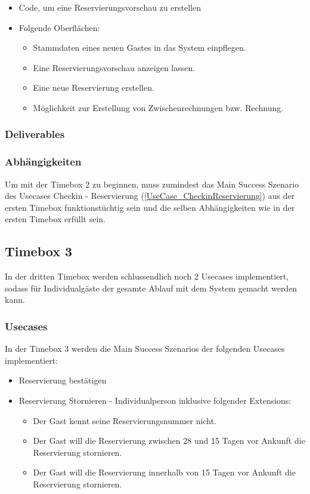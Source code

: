 \begin{itemize}
	\item Code, um eine \Gls{Reservierung}svorschau zu erstellen
	\item Folgende Oberflächen:
	\begin{itemize}
		\item Stammdaten eines neuen \Gls{Gast}es in das System einpflegen.
		\item Eine \Gls{Reservierung}svorschau anzeigen lassen.
		\item Eine neue \Gls{Reservierung} erstellen.
		\item Möglichkeit zur Erstellung von Zwischenrechnungen bzw. \Gls{Rechnung}.
	\end{itemize}
\end{itemize}

\subsubsection{Deliverables}
\subsubsection{Abhängigkeiten}
Um mit der Timebox 2 zu beginnen, muss zumindest das Main Success Szenario des Usecases Checkin - Reservierung (\ref{UseCase_CheckinReservierung}) aus der ersten Timebox funktionstüchtig sein
und die selben Abhängigkeiten wie in der ersten Timebox erfüllt sein.


\subsection{Timebox 3}
In der dritten Timebox werden schlussendlich noch 2 Usecases implementiert, sodass für Individualgäste der gesamte Ablauf mit dem System gemacht werden kann.

\subsubsection{Usecases}
In der Timebox 3 werden die Main Success Szenarios der folgenden Usecases implementiert:

\begin{itemize}
	\item \Gls{Reservierung} bestätigen
	\item \Gls{Reservierung} Stornieren - Individualperson inklusive folgender Extensions:
	\begin{itemize}
		\item Der \Gls{Gast} kennt seine \Gls{Reservierungsnummer} nicht.
		\item Der \Gls{Gast} will die Reservierung zwischen 28 und 15 Tagen vor Ankunft die Reservierung stornieren.
		\item Der \Gls{Gast} will die Reservierung innerhalb von 15 Tagen vor Ankunft die Reservierung stornieren.
	\end{itemize}
\end{itemize}
